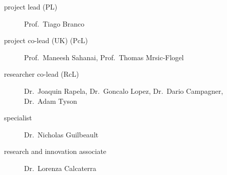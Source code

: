 
\begin{description}
    \item[project lead (PL)] Prof.~Tiago Branco
    \item[project co-lead (UK) (PcL)] Prof.~Maneesh Sahanai, Prof.~Thomas Mrsic-Flogel
    \item[researcher co-lead (RcL)] Dr.~Joaquin Rapela, Dr.~Goncalo Lopez,
        Dr.~Dario Campagner, Dr.~Adam Tyson
    \item[specialist] Dr.~Nicholas Guilbeault
    \item[research and innovation associate] Dr.~Lorenza Calcaterra
\end{description}
